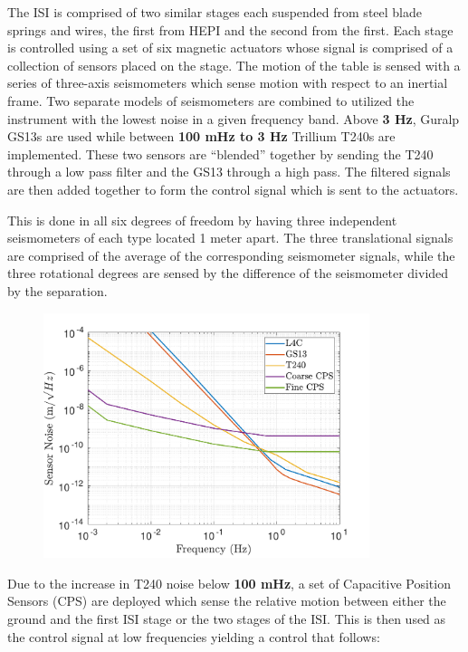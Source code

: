 \documentclass [12pt, proquest]{uwthesis}[2019]
\begin{document}
The ISI is comprised of two similar stages each suspended from steel blade springs and wires, the first from HEPI and the second from the first. Each stage is controlled using a set of six magnetic actuators whose signal is comprised of a collection of sensors placed on the stage. The motion of the table is sensed with a series of three-axis seismometers which sense motion with respect to an inertial frame. Two separate models of seismometers are combined to utilized the instrument with the lowest noise in a given frequency band. Above \textbf{3 Hz}, Guralp GS13s are used while between \textbf{100 mHz to 3 Hz} Trillium T240s are implemented. These two sensors are ``blended'' together by sending the T240 through a low pass filter and the GS13 through a high pass. The filtered signals are then added together to form the control signal which is sent to the actuators. 

This is done in all six degrees of freedom by having three independent seismometers of each type located 1 meter apart. The three translational signals are comprised of the average of the corresponding seismometer signals, while the three rotational degrees are sensed by the difference of the seismometer divided by the separation.

\begin{figure}%
\begin{center}
\includegraphics[width=0.85\textwidth]{seismicSensNoise.pdf}
\caption{}
\label{seisNoise}
\end{center}
\end{figure}

Due to the increase in T240 noise below \textbf{100 mHz}, a set of Capacitive Position Sensors (CPS) are deployed which sense the relative motion between either the ground and the first ISI stage or the two stages of the ISI. This is then used as the control signal at low frequencies yielding a control that follows:
\end{document}
